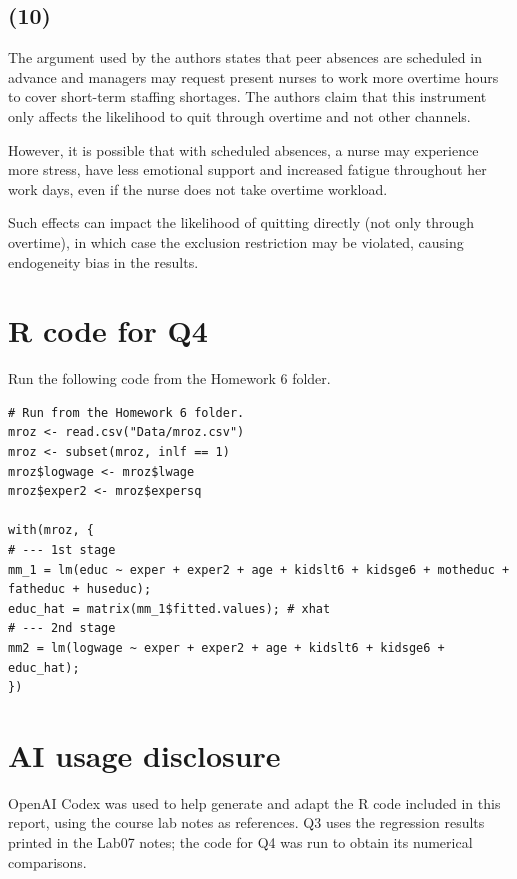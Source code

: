 \documentclass[11pt]{article}
\begin{document}
\subsection{(10)}
The argument used by the authors states that peer absences are scheduled
in advance and managers may request present nurses to work more overtime
hours to cover short-term staffing shortages. The authors claim that this
instrument only affects the likelihood to quit through overtime and not
other channels.

However, it is possible that with scheduled absences, a nurse may
experience more stress, have less emotional support and increased fatigue
throughout her work days, even if the nurse does not take overtime workload.

Such effects can impact the likelihood of quitting directly (not only
through overtime), in which case the exclusion restriction may be violated,
causing endogeneity bias in the results.

\clearpage
\appendix
\section{R code for Q4}
\label{app:iv-code}
Run the following code from the Homework 6 folder.
\begin{lstlisting}[style=Rcode,caption={The HW6 Q4 commands with data loading.},label={lst:q4-code}]
# Run from the Homework 6 folder.
mroz <- read.csv("Data/mroz.csv")
mroz <- subset(mroz, inlf == 1)
mroz$logwage <- mroz$lwage
mroz$exper2 <- mroz$expersq

with(mroz, {
# --- 1st stage
mm_1 = lm(educ ~ exper + exper2 + age + kidslt6 + kidsge6 + motheduc + fatheduc + huseduc);
educ_hat = matrix(mm_1$fitted.values); # xhat
# --- 2nd stage
mm2 = lm(logwage ~ exper + exper2 + age + kidslt6 + kidsge6 + educ_hat);
})
\end{lstlisting}

\section*{AI usage disclosure}
OpenAI Codex was used to help generate and adapt the R code included
in this report, using the course lab notes as references. Q3 uses the regression results printed in the Lab07 notes; the code
for Q4 was run to obtain its numerical comparisons.
\end{document}
